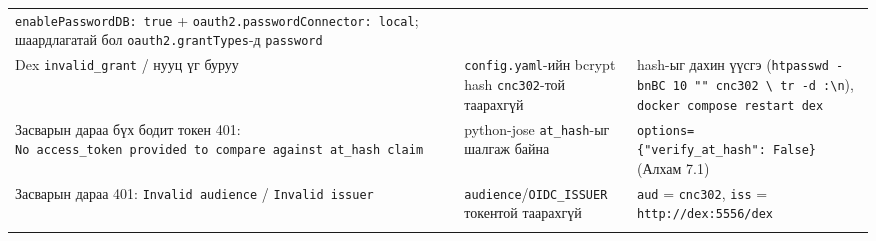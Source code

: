 \begin{longtable}[]{@{}lll@{}}
\begin{minipage}[t]{0.30\columnwidth}
\texttt{enablePasswordDB:\allowbreak{}\ true} + \texttt{oauth2.\allowbreak{}passwordConnector:\allowbreak{}\ local}; шаардлагатай бол \texttt{oauth2.\allowbreak{}grantTypes}-д \texttt{password}\strut
\end{minipage}\tabularnewline
\begin{minipage}[t]{0.30\columnwidth}\raggedright
Dex \texttt{invalid\_grant} / нууц үг буруу\strut
\end{minipage} & \begin{minipage}[t]{0.30\columnwidth}\raggedright
\texttt{config.yaml}-ийн bcrypt hash \texttt{cnc302}-той таарахгүй\strut
\end{minipage} & \begin{minipage}[t]{0.30\columnwidth}\raggedright
hash-ыг дахин үүсгэ (\texttt{htpasswd\ -bnBC\ 10\ ""\ cnc302\ \textbackslash{}\textbar{}\ tr\ -d\ \textquotesingle{}:\textbackslash{}n\textquotesingle{}}), \texttt{docker\ compose\ restart\ dex}\strut
\end{minipage}\tabularnewline
\begin{minipage}[t]{0.30\columnwidth}\raggedright
Засварын дараа бүх бодит токен 401: \texttt{No\ access\_\allowbreak{}token\ provided\ to\ compare\ against\ at\_\allowbreak{}hash\ claim}\strut
\end{minipage} & \begin{minipage}[t]{0.30\columnwidth}\raggedright
python-jose \texttt{at\_hash}-ыг шалгаж байна\strut
\end{minipage} & \begin{minipage}[t]{0.30\columnwidth}\raggedright
\texttt{options=\allowbreak{}\{"verify\_\allowbreak{}at\_\allowbreak{}hash":\allowbreak{}\ False\}} (Алхам 7.1)\strut
\end{minipage}\tabularnewline
\begin{minipage}[t]{0.30\columnwidth}\raggedright
Засварын дараа 401: \texttt{Invalid\ audience} / \texttt{Invalid\ issuer}\strut
\end{minipage} & \begin{minipage}[t]{0.30\columnwidth}\raggedright
\texttt{audience}/\allowbreak\texttt{OIDC\_ISSUER} токентой таарахгүй\strut
\end{minipage} & \begin{minipage}[t]{0.30\columnwidth}\raggedright
\texttt{aud} = \texttt{cnc302}, \texttt{iss} = \texttt{http:\allowbreak{}/\allowbreak{}/\allowbreak{}dex:\allowbreak{}5556/\allowbreak{}dex}\strut
\end{minipage}\tabularnewline
\begin{minipage}[t]{0.30\columnwidth}\raggedright

\end{minipage}
\end{longtable}
